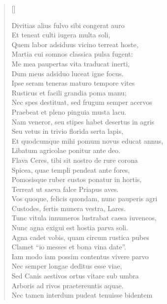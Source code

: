 \settowidth{\versewidth}{Nunc levis est tractanda Venus, dum frangere postes}
\begin{verse}[\versewidth]
\begin{altverse}
{\large
Divitias alius fulvo sibi congerat auro\\
Et teneat culti iugera multa soli,\\
Quem labor adsiduus vicino terreat hoste,\\
Martia cui somnos classica pulsa fugent:\\
Me mea paupertas vita traducat inerti,\\
Dum meus adsiduo luceat igne focus.\\
Ipse seram teneras maturo tempore vites\\
Rusticus et facili grandia poma manu;\\
Nec spes destituat, sed frugum semper acervos\\
Praebeat et pleno pinguia musta lacu.\\
Nam veneror, seu stipes habet desertus in agris\\
Seu vetus in trivio florida serta lapis,\\
Et quodcumque mihi pomum novus educat annus,\\
Libatum agricolae ponitur ante deo.\\
Flava Ceres, tibi sit nostro de rure corona\\
Spicea, quae templi pendeat ante fores,\\
Pomosisque ruber custos ponatur in hortis,\\
Terreat ut saeva falce Priapus aves.\\
Vos quoque, felicis quondam, nunc pauperis agri\\
Custodes, fertis munera vestra, Lares.\\
Tunc vitula innumeros lustrabat caesa iuvencos,\\
Nunc agna exigui est hostia parva soli.\\
Agna cadet vobis, quam circum rustica pubes\\
Clamet ``io messes et bona vina date''.\\
Iam modo iam possim contentus vivere parvo\\
Nec semper longae deditus esse viae,\\
Sed Canis aestivos ortus vitare sub umbra\\
Arboris ad rivos praetereuntis aquae.\\
Nec tamen interdum pudeat tenuisse bidentem\\
}
\end{altverse}
\end{verse}

